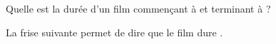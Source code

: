 \begin{exercice*}
    Quelle est la durée d'un film commençant à  et terminant à
     ?
\end{exercice*}
\begin{corrige}
    La frise suivante permet de dire que le film dure .
    \begin{center}
    \end{center}
\end{corrige}